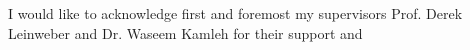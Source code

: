 
\begin{acknowledgements}      


I would like to acknowledge first and foremost my supervisors Prof. Derek Leinweber and Dr. Waseem Kamleh for their support and 


\end{acknowledgements}
